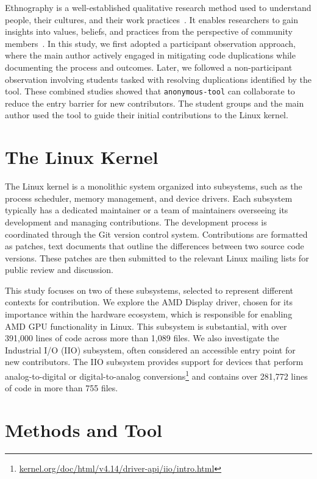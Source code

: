\documentclass[10pt,conference]{IEEEtran}
\begin{document}
Ethnography is a well-established qualitative research method used to understand people, their cultures, and their work practices~\cite{bookethno}. It enables researchers to gain insights into values, beliefs, and practices from the perspective of community members~\cite{ethnosoft}.  
In this study, we first adopted a participant observation approach, where the main author actively engaged in mitigating code duplications while documenting the process and outcomes. Later, we followed a non-participant observation involving students tasked with resolving duplications identified by the tool. These combined studies showed that \texttt{anonymous-tool} can collaborate to reduce the entry barrier for new contributors. The student groups and the main author used the tool to guide their initial contributions to the Linux kernel.


\section{The Linux Kernel}

The Linux kernel is a monolithic system organized into subsystems, such as the process scheduler, memory management, and device drivers. Each subsystem typically has a dedicated maintainer or a team of maintainers overseeing its development and managing contributions. The development process is coordinated through the Git version control system. Contributions are formatted as patches, text documents that outline the differences between two source code versions. These patches are then submitted to the relevant Linux mailing lists for public review and discussion.

This study focuses on two of these subsystems, selected to represent different contexts for contribution. We explore the AMD Display driver, chosen for its importance within the hardware ecosystem, which is responsible for enabling AMD GPU functionality in Linux. This subsystem is substantial, with over 391,000 lines of code across more than 1,089 files. We also investigate the Industrial I/O (IIO) subsystem, often considered an accessible entry point for new contributors. The IIO subsystem provides support for devices that perform analog-to-digital or digital-to-analog conversions\footnote{\href{https://kernel.org/doc/html/v4.14/driver-api/iio/intro.html}{kernel.org/doc/html/v4.14/driver-api/iio/intro.html}} and contains over 281,772 lines of code in more than 755 files.

\section{Methods and Tool}
\end{document}
